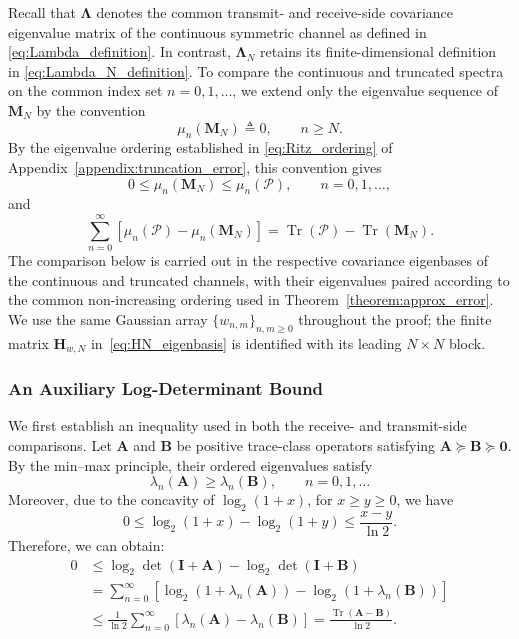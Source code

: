 \documentclass[lettersize,journal]{IEEEtran}
\theoremstyle{plain}
\begin{document}
Recall that $\boldsymbol{\Lambda}$ denotes the common transmit-
and receive-side covariance eigenvalue matrix of the continuous
symmetric channel as defined in
\eqref{eq:Lambda_definition}. In contrast,
$\boldsymbol{\Lambda}_N$ retains its
finite-dimensional definition in
\eqref{eq:Lambda_N_definition}. To compare the continuous and
truncated spectra on the common index set $n=0,1,\ldots$, we
extend only the eigenvalue sequence of $\mathbf M_N$ by the
convention
\begin{equation}
	\mu_n(\mathbf M_N)\triangleq0,
	\qquad n\geq N.
	\label{eq:MN_zero_extension}
\end{equation}
By the eigenvalue ordering established in \eqref{eq:Ritz_ordering} of
Appendix~\ref{appendix:truncation_error}, this convention gives
\begin{equation}
	0
	\leq
	\mu_n(\mathbf M_N)
	\leq
	\mu_n(\mathcal P),
	\qquad n=0,1,\ldots ,
	\label{eq:capacity_spectral_ordering}
\end{equation}
and
\begin{equation}
	\sum_{n=0}^{\infty}
	\left[
	\mu_n(\mathcal P)-\mu_n(\mathbf M_N)
	\right]
	=
	\operatorname{Tr}(\mathcal P)
	-
	\operatorname{Tr}(\mathbf M_N).
	\label{eq:trace_equivalence}
\end{equation}
The comparison below is carried out in the respective covariance
eigenbases of the continuous and truncated channels, with their
eigenvalues paired according to the common non-increasing ordering
used in Theorem~\ref{theorem:approx_error}. We use the same
Gaussian array $\{w_{n,m}\}_{n,m\geq0}$ throughout the proof;
the finite matrix $\mathbf H_{w,N}$ in~\eqref{eq:HN_eigenbasis} is identified
with its leading $N\times N$ block.

\subsubsection{An Auxiliary Log-Determinant Bound}

We first establish an inequality used in both the receive- and
transmit-side comparisons. Let $\mathbf{A}$ and $\mathbf{B}$ be
positive trace-class operators satisfying $\mathbf{A}\succeq\mathbf{B}\succeq\mathbf{0}$.
By the min--max principle, their ordered eigenvalues satisfy
$$
	\lambda_n(\mathbf{A})
	\geq
	\lambda_n(\mathbf{B}),
	\qquad n=0,1,\ldots
$$
Moreover, due to the concavity of $\log_2(1 + x)$, for $x\geq y\geq0$, we have
\begin{equation}
	0
	\leq
	\log_2(1+x)-\log_2(1+y)
	\leq
	\frac{x-y}{\ln2}.
	\label{eq:scalar_log_bound}
\end{equation}
Therefore, we can obtain:
\begin{align}
	0
	&\leq
	\log_2\det(\mathbf{I}+\mathbf{A})
	-
	\log_2\det(\mathbf{I}+\mathbf{B})
	\nonumber\\
	&=
	\sum_{n=0}^{\infty}
	\left[
	\log_2\!\left(1+\lambda_n(\mathbf{A})\right)
	-
	\log_2\!\left(1+\lambda_n(\mathbf{B})\right)
	\right]
	\nonumber\\
	&\leq
	\frac{1}{\ln2}
	\sum_{n=0}^{\infty}
	\left[
	\lambda_n(\mathbf{A})
	-
	\lambda_n(\mathbf{B})
	\right] =
	\frac{
		\operatorname{Tr}(\mathbf{A}-\mathbf{B})
	}{\ln2}.
	\label{eq:logdet_trace_bound}
\end{align}
\end{document}
